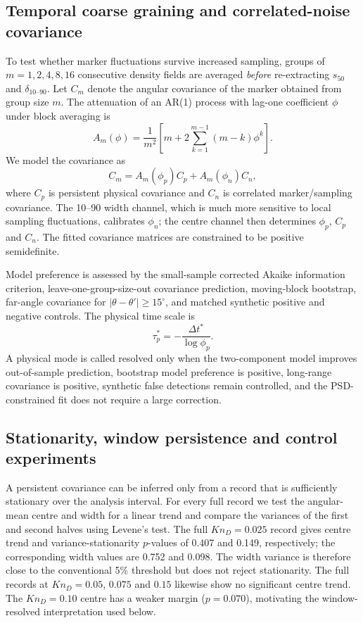 \documentclass[paper]{JFM-FLM_Au}
\newcommand{\KnD}{Kn_D}
\newcommand{\tstar}{t^*}
\newcommand{\scenter}{s_{50}}
\newcommand{\deltaten}{\delta_{10\text{--}90}}
\begin{document}
\subsection{Temporal coarse graining and correlated-noise covariance}
To test whether marker fluctuations survive increased sampling, groups of $m=1,2,4,8,16$ consecutive density fields are averaged \emph{before} re-extracting $\scenter$ and $\deltaten$. Let $C_m$ denote the angular covariance of the marker obtained from group size $m$. The attenuation of an AR(1) process with lag-one coefficient $\phi$ under block averaging is
\begin{equation}
 A_m(\phi)=\frac{1}{m^2}\left[m+2\sum_{k=1}^{m-1}(m-k)\phi^k\right].
 \label{eq:attenuation}
\end{equation}
We model the covariance as
\begin{equation}
 C_m=A_m(\phi_p)C_p+A_m(\phi_n)C_n,
 \label{eq:covmodel}
\end{equation}
where $C_p$ is persistent physical covariance and $C_n$ is correlated marker/sampling covariance. The 10--90 width channel, which is much more sensitive to local sampling fluctuations, calibrates $\phi_n$; the centre channel then determines $\phi_p$, $C_p$ and $C_n$. The fitted covariance matrices are constrained to be positive semidefinite.

Model preference is assessed by the small-sample corrected Akaike information criterion, leave-one-group-size-out covariance prediction, moving-block bootstrap, far-angle covariance for $|\theta-\theta'|\geq15^\circ$, and matched synthetic positive and negative controls. The physical time scale is
\begin{equation}
 \tau_p^*=-\frac{\Delta \tstar}{\log \phi_p}.
\end{equation}
A physical mode is called resolved only when the two-component model improves out-of-sample prediction, bootstrap model preference is positive, long-range covariance is positive, synthetic false detections remain controlled, and the PSD-constrained fit does not require a large correction.

\subsection{Stationarity, window persistence and control experiments}
A persistent covariance can be inferred only from a record that is sufficiently stationary over the analysis interval. For every full record we test the angular-mean centre and width for a linear trend and compare the variances of the first and second halves using Levene's test. The full $\KnD=0.025$ record gives centre trend and variance-stationarity $p$-values of 0.407 and 0.149, respectively; the corresponding width values are 0.752 and 0.098. The width variance is therefore close to the conventional 5\% threshold but does not reject stationarity. The full records at $\KnD=0.05$, $0.075$ and $0.15$ likewise show no significant centre trend. The $\KnD=0.10$ centre has a weaker margin ($p=0.070$), motivating the window-resolved interpretation used below.
\end{document}
